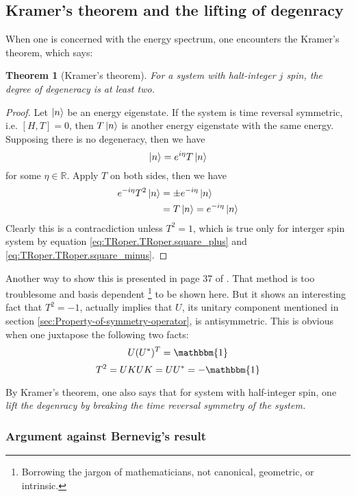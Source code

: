 \documentclass{article}
\numberwithin{equation}{subsection} %
\newtheorem{thm}{Theorem}[section]
\theoremstyle{definition}
\begin{document}
    \subsection{Kramer's theorem and the lifting of degenracy}
    \label{sec:Kramers-theorem-and-the-lifting-of-degenracy}
    When one is concerned with the energy spectrum, one encounters the
    Kramer's theorem, which says:
    \begin{thm}[Kramer's theorem]
        For a system with halt-integer $j$ spin, the degree of degeneracy
        is at least two.
    \end{thm}
    \begin{proof}
        Let $\ket{n}$ be an energy eigenstate. If the system is time
        reversal symmetric, i.e. $[H,T]=0$, then $T \ket{n}$ is
        another energy eigenstate with the same energy. Supposing there is
        no degeneracy, then we have
        $$ \ket{n} = e^{i\eta}T\ket{n}$$
        for some $\eta\in \mathbb{R}$. Apply $T$ on both sides, then
        we have
        \begin{align*}
            e^{-i\eta} T^2 \ket{n} &= \pm e^{-i\eta}\ket{n} \\
            &= T \ket{n} = e^{-i\eta} \ket{n}
        \end{align*}
        Clearly this is a contracdiction unless $T^2=1$, which is
        true only for interger spin system by equation
        \ref{eq:TRoper.TRoper.square_plus} and
        \ref{eq:TRoper.TRoper.square_minus}.
    \end{proof}
    Another way to show this is presented in page 37 of
    \cite{bernevig}. That method is too troublesome and basis dependent 
    \footnote{Borrowing the jargon of mathematicians, not canonical,
        geometric, or intrinsic.}
    to be shown here.
    But it shows an interesting fact that $T^2=-1$, actually
    implies that $U$, its unitary component mentioned in section
    \ref{sec:Property-of-symmetry-operator}, is antisymmetric. This is
    obvious when one juxtapose the following two facts:
    $$ U (U^*)^T = \mathbbm{1}$$
    $$ T^2 = UKUK = U U^* = -\mathbbm{1} $$

    By Kramer's theorem, one also says that for system with half-integer
    spin, one \textit{lift the degenracy by breaking the time reversal
    symmetry of the system.}
    
        \subsubsection{Argument against Bernevig's result}
        \label{sec:Argument again Bernevig's result}
        
\end{document}
